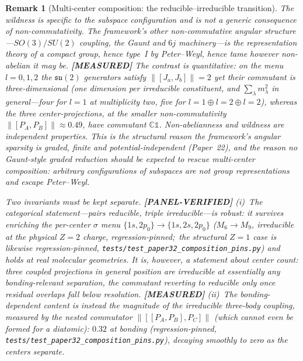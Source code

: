 \documentclass[11pt]{article}
\newtheorem{remark}{Remark}
\begin{document}
\begin{remark}[Multi-center composition: the reducible--irreducible transition]
The wildness is specific to the subspace configuration and is \emph{not}
a generic consequence of non-commutativity.  The framework's other
non-commutative angular structure---$SO(3)/SU(2)$ coupling, the Gaunt and
$6j$ machinery---is the representation theory of a \emph{compact} group,
hence type~I by Peter--Weyl, hence tame however non-abelian it may be.
\textbf{[MEASURED]} The contrast is quantitative: on the menu $l = 0, 1, 2$ the $\mathfrak{su}(2)$
generators satisfy $\lVert [J_a, J_b] \rVert = 2$ yet their commutant is
three-dimensional (one dimension per irreducible constituent, and
$\sum_\lambda m_\lambda^2$ in general---four for $l\!=\!1$ at multiplicity
two, five for $l\!=\!1 \oplus l\!=\!2 \oplus l\!=\!2$), whereas the three
center-projections, at the \emph{smaller} non-commutativity
$\lVert [P_A, P_B] \rVert \approx 0.49$, have commutant
$\mathbb{C}\mathbb{1}$.  Non-abelianness and wildness are independent
properties.  This is the structural reason the framework's angular
sparsity is graded, finite and potential-independent (Paper~22), and the
reason no Gaunt-style graded reduction should be expected to rescue
multi-center composition: arbitrary configurations of subspaces are not
group representations and escape Peter--Weyl.

Two invariants must be kept separate.  \textbf{[PANEL-VERIFIED]} (i)~The \emph{categorical}
statement---pairs reducible, triple irreducible---is robust: it survives
enriching the per-center $\sigma$ menu
$\{1s, 2p_0\} \!\to\! \{1s, 2s, 2p_0\}$ ($M_6 \!\to\! M_9$, irreducible
at the physical $Z=2$ charge, regression-pinned;\ the structural $Z=1$
case is likewise regression-pinned,
\texttt{tests/test\_paper32\_composition\_pins.py}) and holds at real
molecular geometries.  It is, however, a statement about center
\emph{count}: three coupled projections in general position are
irreducible at essentially any bonding-relevant separation, the
commutant reverting to reducible only once residual overlaps fall below
resolution.  \textbf{[MEASURED]} (ii)~The bonding-dependent content is instead the
\emph{magnitude} of the irreducible three-body coupling, measured by the
nested commutator $\lVert [[P_A, P_B], P_C] \rVert$ (which cannot even
be formed for a diatomic): $0.32$ at bonding (regression-pinned,
\texttt{tests/test\_paper32\_composition\_pins.py}), decaying smoothly
to zero as the centers separate.


\end{remark}
\end{document}
